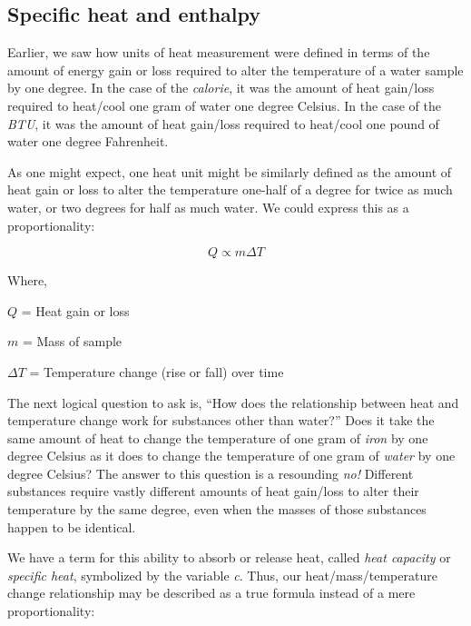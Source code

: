 





\filbreak
\subsection{Specific heat and enthalpy}

Earlier, we saw how units of heat measurement were defined in terms of the amount of energy gain or loss required to alter the temperature of a water sample by one degree.  In the case of the \textit{calorie}, it was the amount of heat gain/loss required to heat/cool one gram of water one degree Celsius.  In the case of the \textit{BTU}, it was the amount of heat gain/loss required to heat/cool one pound of water one degree Fahrenheit.

As one might expect, one heat unit might be similarly defined as the amount of heat gain or loss to alter the temperature one-half of a degree for twice as much water, or two degrees for half as much water.  We could express this as a proportionality:

$$Q \propto m \Delta T$$

\noindent
Where,

$Q$ = Heat gain or loss

$m$ = Mass of sample

$\Delta T$ = Temperature change (rise or fall) over time

\vskip 10pt

The next logical question to ask is, ``How does the relationship between heat and temperature change work for substances other than water?''  Does it take the same amount of heat to change the temperature of one gram of \textit{iron} by one degree Celsius as it does to change the temperature of one gram of \textit{water} by one degree Celsius?  The answer to this question is a resounding \textit{no!}  Different substances require vastly different amounts of heat gain/loss to alter their temperature by the same degree, even when the masses of those substances happen to be identical.

We have a term for this ability to absorb or release heat, called \textit{heat capacity} or \textit{specific heat}, symbolized by the variable \textit{c}.  Thus, our heat/mass/temperature change relationship may be described as a true formula instead of a mere proportionality:

